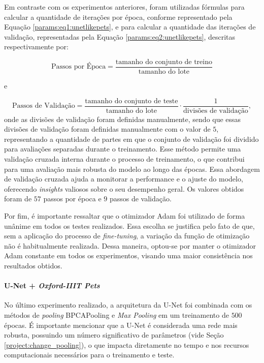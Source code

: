 Em contraste com os experimentos anteriores, foram utilizadas fórmulas para calcular a quantidade de iterações por época, conforme representado pela Equação \ref{params:eq1:unetlikepets}, e para calcular a quantidade das iterações de validação, representadas pela Equação \ref{params:eq2:unetlikepets}, descritas respectivamente por:

\begin{equation}
    \label{params:eq1:unetlikepets}
    \text{Passos por Época} = \frac{\text{tamanho do conjunto de treino}}{\text{tamanho do lote}}
\end{equation}

e

\begin{equation}
    \label{params:eq2:unetlikepets}
    \text{Passos de Validação} = \frac{\text{tamanho do conjunto de teste}}{\text{tamanho do lote}} \cdot \frac{1}{\text{divisões de validação}},
\end{equation}
onde as divisões de validação foram definidas manualmente, sendo que essas divisões de validação foram definidas manualmente com o valor de $5$, representando a quantidade de partes em que o conjunto de validação foi dividido para avaliações separadas durante o treinamento. Esse método permite uma validação cruzada interna durante o processo de treinamento, o que contribui para uma avaliação mais robusta do modelo ao longo das épocas. Essa abordagem de validação cruzada ajuda a monitorar a performance e o ajuste do modelo, oferecendo\textit{ insights }valiosos sobre o seu desempenho geral. Os valores obtidos foram de $57$ passos por época e $9$ passos de validação.

Por fim, é importante ressaltar que o otimizador Adam foi utilizado de forma unânime em todos os testes realizados. Essa escolha se justifica pelo fato de que, sem a aplicação do processo de \textit{fine-tuning}, a variação da função de otimização não é habitualmente realizada. Dessa maneira, optou-se por manter o otimizador Adam constante em todos os experimentos, visando uma maior consistência nos resultados obtidos.


\paragraph{U-Net + \textit{Oxford-IIIT Pets}}
\label{params:unetpets}
No último experimento realizado, a arquitetura da U-Net foi combinada com os métodos de \textit{pooling} BPCAPooling e \textit{Max Pooling} em um treinamento de $500$ épocas. É importante mencionar que a U-Net é considerada uma rede mais robusta, possuindo um número significativo de parâmetros (vide Seção \ref{project:change_pooling}), o que impacta diretamente no tempo e nos recursos computacionais necessários para o treinamento e teste.

